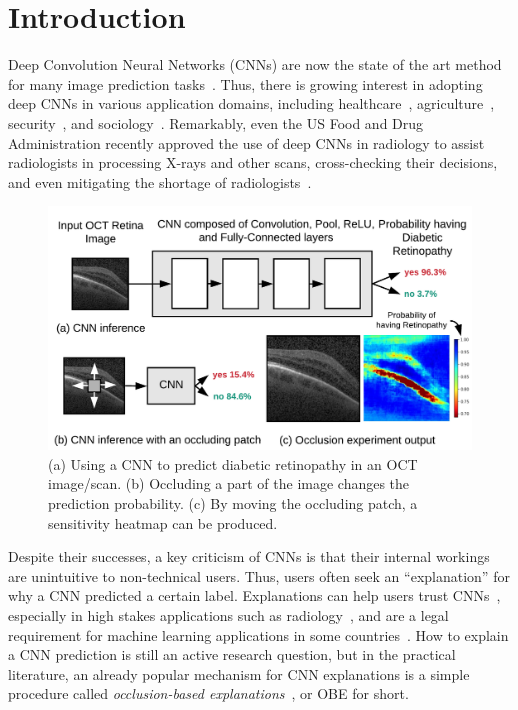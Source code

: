 \section{Introduction}
Deep Convolution Neural Networks (CNNs) are now the state of the art method for many image prediction tasks~\cite{imagenet}. Thus, there is growing interest in adopting deep CNNs in various application domains, including healthcare~\cite{kermany2018identifying, islam2017abnormality}, agriculture~\cite{mohanty2016using}, security~\cite{arbabzadah2016identifying}, and sociology~\cite{wang2017deep}. Remarkably, even the US Food and Drug Administration recently approved the use of deep CNNs in radiology to assist radiologists in processing X-rays and other scans, cross-checking their decisions, and even mitigating the shortage of radiologists~\cite{fdaretinopathy,radiologistshortage}.

\begin{figure}[t]
\includegraphics[width=\columnwidth]{./images/krypton_overview}
\caption{(a) Using a CNN to predict diabetic retinopathy in an OCT image/scan. (b) Occluding a part of the image changes the prediction probability. (c) By moving the occluding patch, a sensitivity heatmap can be produced.}
\label{fig:krypton_overview}
\vspace{-4mm}
\end{figure}

Despite their successes, a key criticism of CNNs is that their internal workings are unintuitive to non-technical users. Thus, users often seek an ``explanation'' for why a CNN predicted a certain label. Explanations can help users trust CNNs~\cite{ribeiro2016should}, especially in high stakes applications such as radiology~\cite{jung2017deep}, and are a legal requirement for machine learning applications in some countries~\cite{gdpr}. How to explain a CNN prediction is still an active research question, but in the practical literature, an already popular mechanism for CNN explanations is a simple procedure called \textit{occlusion-based explanations}~\cite{zeiler2014visualizing}, or OBE for short.

